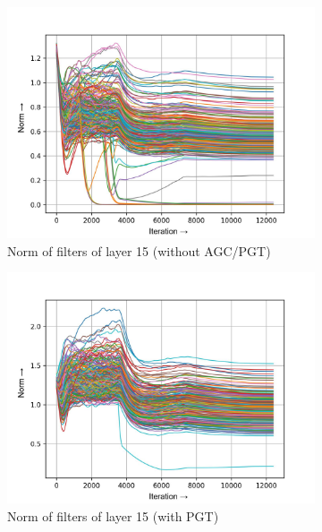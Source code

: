 \documentclass[times,sort&compress]{elsarticle}
\begin{document}
\begin{figure}[t]
\centering
\captionsetup{font=scriptsize}

\begin{subfigure}[t]{0.32\textwidth}
\includegraphics[width=\linewidth]{baseline-w-layer-5-3}
\caption{Norm of filters of layer 15 (without AGC/PGT)}
\end{subfigure}
\begin{subfigure}[t]{0.32\textwidth}
\includegraphics[width=\linewidth]{pgt-w-layer-5-3}
\caption{Norm of filters of layer 15 (with PGT)}
\end{subfigure}
\begin{subfigure}[t]{0.32\textwidth}

\end{subfigure}
\end{figure}
\end{document}
